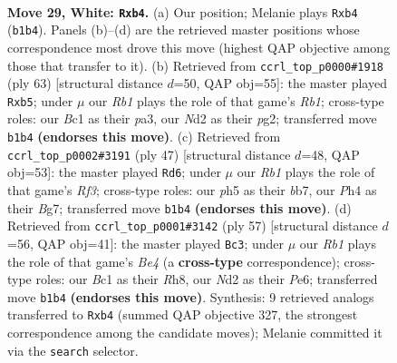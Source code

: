 \documentclass[11pt]{article}
\begin{document}
\clearpage

\begin{figure}[p]\centering
\begin{subfigure}{0.46\textwidth}\centering
\resizebox{\linewidth}{!}{%
\newchessgame
\chessboard[
  setfen={6r1/1b3pk1/2p3p1/2P2r1p/Bp5P/8/P2N2PK/1RB5 w - - 0 29},
  showmover=false,
  pgfstyle=straightmove, color=movearrow, markmove={b1-b4}
]}
\caption{}
\end{subfigure}\hfill
\begin{subfigure}{0.46\textwidth}\centering
\resizebox{\linewidth}{!}{%
\newchessgame
\chessboard[
  setfen={1r4k1/6pp/3pp1b1/1P6/3P4/P2P3R/1B4PP/6K1 b - - 0 32},
  showmover=false,
  pgfstyle=straightmove, color=movearrow, markmove={b8-b5}
]}
\caption{}
\end{subfigure}
\\[4pt]
\begin{subfigure}{0.46\textwidth}\centering
\resizebox{\linewidth}{!}{%
\newchessgame
\chessboard[
  setfen={6k1/pB4b1/5rpp/2p5/n7/P2p2P1/1P3P1P/2R2RK1 b - - 5 24},
  showmover=false,
  pgfstyle=straightmove, color=movearrow, markmove={f6-d6}
]}
\caption{}
\end{subfigure}\hfill
\begin{subfigure}{0.46\textwidth}\centering
\resizebox{\linewidth}{!}{%
\newchessgame
\chessboard[
  setfen={3k3r/3b3p/4p3/RPp1b3/P1P5/4P3/2B3PP/6K1 b - - 0 29},
  showmover=false,
  pgfstyle=straightmove, color=movearrow, markmove={e5-c3}
]}
\caption{}
\end{subfigure}
\caption{\textbf{Move 29, White: \texttt{Rxb4}.} (a) Our position; Melanie plays \texttt{Rxb4} (\texttt{b1b4}). Panels (b)--(d) are the retrieved master positions whose correspondence most drove this move (highest QAP objective among those that transfer to it). (b) Retrieved from \texttt{ccrl\_top\_p0000\#1918} (ply 63) [structural distance $d$=50, QAP obj=55]: the master played \texttt{Rxb5}; under $\mu$ our \emph{Rb1} plays the role of that game's \emph{Rb1}; cross-type roles: our \emph{B}c1 as their \emph{p}a3, our \emph{N}d2 as their \emph{p}g2; transferred move \texttt{b1b4} \textbf{(endorses this move)}. (c) Retrieved from \texttt{ccrl\_top\_p0002\#3191} (ply 47) [structural distance $d$=48, QAP obj=53]: the master played \texttt{Rd6}; under $\mu$ our \emph{Rb1} plays the role of that game's \emph{Rf3}; cross-type roles: our \emph{p}h5 as their \emph{b}b7, our \emph{P}h4 as their \emph{B}g7; transferred move \texttt{b1b4} \textbf{(endorses this move)}. (d) Retrieved from \texttt{ccrl\_top\_p0001\#3142} (ply 57) [structural distance $d$=56, QAP obj=41]: the master played \texttt{Bc3}; under $\mu$ our \emph{Rb1} plays the role of that game's \emph{Be4} (a \textbf{cross-type} correspondence); cross-type roles: our \emph{B}c1 as their \emph{R}h8, our \emph{N}d2 as their \emph{P}e6; transferred move \texttt{b1b4} \textbf{(endorses this move)}. Synthesis: 9 retrieved analogs transferred to \texttt{Rxb4} (summed QAP objective 327, the strongest correspondence among the candidate moves); Melanie committed it via the \texttt{search} selector.}
\label{fig:thought-m56}
\end{figure}
\end{document}
